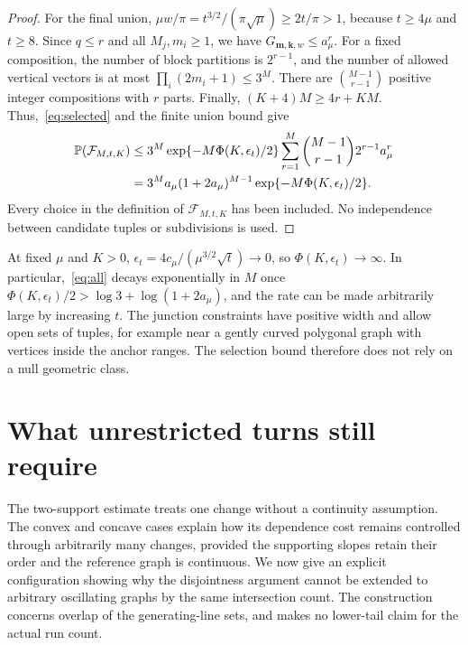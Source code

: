 \documentclass[11pt,letterpaper]{article}
\begin{document}
\begin{proof}
For the final union, $\mu w/\pi=t^{3/2}/(\pi\sqrt\mu)\ge2t/\pi>1$, because $t\ge4\mu$ and $t\ge8$. Since $q\le r$ and all $M_j,m_i\ge1$, we have $G_{\boldsymbol m,\boldsymbol k,w}\le a_\mu^r$. For a fixed composition, the number of block partitions is $2^{r-1}$, and the number of allowed vertical vectors is at most $\prod_i(2m_i+1)\le3^M$. There are $\binom{M-1}{r-1}$ positive integer compositions with $r$ parts. Finally, $(K+4)M\ge4r+KM$. Thus,~\eqref{eq:selected} and the finite union bound give
\begin{equation}\label{eq:sum}
\begin{aligned}
 \P(\mathcal F_{M,t,K})
 &\le3^M\exp\{-M\Phi(K,\epsilon_t)/2\}
       \sum_{r=1}^M\binom{M-1}{r-1}2^{r-1}a_\mu^r\\
 &=3^M a_\mu(1+2a_\mu)^{M-1}
                 \exp\{-M\Phi(K,\epsilon_t)/2\}.
\end{aligned}
\end{equation}
Every choice in the definition of $\mathcal F_{M,t,K}$ has been included. No independence between candidate tuples or subdivisions is used.
\end{proof}

At fixed $\mu$ and $K>0$, $\epsilon_t=4c_\mu/(\mu^{3/2}\sqrt t)\to0$, so $\Phi(K,\epsilon_t)\to\infty$. In particular,~\eqref{eq:all} decays exponentially in $M$ once $\Phi(K,\epsilon_t)/2>\log3+\log(1+2a_\mu)$, and the rate can be made arbitrarily large by increasing $t$. The junction constraints have positive width and allow open sets of tuples, for example near a gently curved polygonal graph with vertices inside the anchor ranges. The selection bound therefore does not rely on a null geometric class.

\section{What unrestricted turns still require}

The two-support estimate treats one change without a continuity assumption. The convex and concave cases explain how its dependence cost remains controlled through arbitrarily many changes, provided the supporting slopes retain their order and the reference graph is continuous. We now give an explicit configuration showing why the disjointness argument cannot be extended to arbitrary oscillating graphs by the same intersection count. The construction concerns overlap of the generating-line sets, and makes no lower-tail claim for the actual run count.
\end{document}
